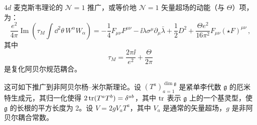 \begin{definition}[17.24] $4d$ 麦克斯韦理论的 $\mathcal{N}=1$ 推广，或等价地 $\mathcal{N}=1$ 矢量超场的动能（与 $\Theta$）项，为：
\begin{equation}
\frac{e^2}{4\pi}\operatorname{Im}\left(\tau_M\int \dd^2\theta\,W^\alpha W_\alpha\right)=-\frac{1}{4}F_{\mu\nu}F^{\mu\nu}-\ii\lambda\sigma^\mu\partial_\mu\bar\lambda+\frac{1}{2}D^2+\frac{\Theta e^2}{16\pi^2}F_{\mu\nu}(\star F)^{\mu\nu}\,,
\tag{17.15}
\end{equation}
其中
\begin{equation}
\tau_M=\frac{2\pi\ii}{e^2}+\frac{\Theta}{2\pi}
\tag{17.16}
\end{equation}
是复化阿贝尔规范耦合。\end{definition}


这可如下推广到非阿贝尔杨–米尔斯理论。设 $(T^a)_{a=1}^{\dim\mathfrak{g}}$ 是紧单李代数 $\mathfrak{g}$ 的厄米特生成元，其归一化使得 $2\operatorname{tr}(T^aT^b)=\delta^{ab}$，其中 $\operatorname{tr}$ 表示 $\mathfrak{g}$ 上的一个基灵型，使 $\mathfrak{g}$ 的长根的平方长度为 2。设 $V=2gV_aT^a$，其中 $V_a$ 是通常的矢量超场，$g$ 是非阿贝尔耦合常数。

